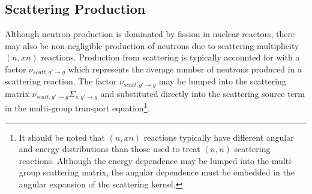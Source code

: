 





\subsection{Scattering Production}
\label{sec:chap2-scatt-prod}

Although neutron production is dominated by fission in nuclear reactors, there may also be non-negligible production of neutrons due to scattering multiplicity $(n,xn)$ reactions. Production from scattering is typically accounted for with a factor $\nu_{scatt,g' \rightarrow g}$ which represents the average number of neutrons produced in a scattering reaction. The factor $\nu_{scatt,g' \rightarrow g}$ may be lumped into the scattering matrix $\nu_{scatt,g' \rightarrow g}\Sigma_{s,g' \rightarrow g}$ and substituted directly into the scattering source term in the multi-group transport equation\footnote{It should be noted that $(n,xn)$ reactions typically have different angular and energy distributions than those used to treat $(n,n)$ scattering reactions. Although the energy dependence may be lumped into the multi-group scattering matrix, the angular dependence must be embedded in the angular expansion of the scattering kernel.}.

